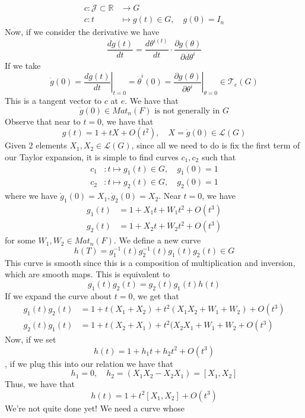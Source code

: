 \documentclass[11pt, oneside]{article}   	%
\theoremstyle{slanted}
\begin{document}
\begin{align*}
	c : \mathcal{ J } \subset \mathbb{ R}  & \to G \\
	c : t  & \mapsto g ( t) \in G , \quad g ( 0 )  = I_n 
\end{align*} Now, if we consider 
the derivative we have 
\[
	\frac{ d g ( t) }{ dt } = \frac{ d \theta ^{ i ( t ) }}{d t } \cdot \frac{\partial  g ( \theta ) }{\partial d \theta^{ i }} 
\] If we take 
\[
\dot{ g } ( 0 )  = \left. \frac{ d g( t) }{ dt } \right \vert_{ t =0 } = \dot{ \theta}^{ i }( 0 )  = \left. \frac{\partial g ( \theta ) }{\partial \theta^{i }} \right \vert_{ \theta  =0 } \in \mathcal{ T }_e ( G )
\] This is a tangent vector to $c $ at $ e $. 
We have that 
\[
\dot{ g} ( 0 ) \in Mat_n ( F) \text{ is not generally in } G 
\] Observe that near to $ t  = 0 $, we have that 
\[	 g( t)  = 1 + tX + O ( t^2 ), \quad X = \dot{ g} ( 0 ) \in \mathcal{ L }( G )  
\] Given 2 elements $ X_1, X_2 \in \mathcal{ L } ( G ) $, since all 
we need to do is fix the first term of our Taylor expansion, 
it is simple to find curves $ c_1, c_2 $ such that 
\begin{align*}
c_1 &: t \mapsto g_1 ( t) \in G, \quad g_1 ( 0 )  = 1 \\
c_2 &: t \mapsto g_2( t) \in G, \quad g_2 ( 0 )  = 1
\end{align*} where we have $ \dot{ g}_1( 0 )  = X_1, \dot{ g}_2 ( 0 )  = X_2$. 
Near  $ t = 0 $, we have 
\begin{align*}
g_1 ( t ) & = 1 + X_1 t + W_1 t^2 + O ( t^3 ) \\
g_2 ( t) &= 1 + X_2 t + W_2 t^2 + O ( t^ 3 ) 
\end{align*}for some $ W_1, W_2 \in Mat_n ( F) $. 
We define a new curve 
\[
h ( T)  = g^{ - 1}_1( t)  g^{ -1 }_2 ( t ) g_1 ( t) g_2( t) \in G 
\] This curve is smooth since this is a composition of multiplication 
and inversion, which are smooth maps. This is equivalent to 
\[
g_1( t) g_2( t) = g_2 ( t ) g_1 ( t) h ( t) 
\] If we expand the curve about $ t = 0 $, we get 
that 
\begin{align*}
g_1( t)g_2 ( t) &=  1 + t ( X_1 + X_2 ) +t^2 ( X_1 X_2 + W_1 + W_2 ) + O ( t^3)  \\
g_2( t) g_1( t) &=  1 + t ( X_2 + X_1 ) + t^2 ( X_2 X_1 + W_1 + W_2 + O ( t^3 ) 
\end{align*}
Now, if we set 
\[
h ( t) = 1 + h_1 t + h_2 t^2 + O ( t^3 ) 
\], if we plug this into our relation we have that 
\[
h_1 = 0, \quad h_2  = ( X_1 X_2 - X_2 X_1 ) =  [ X_1 , X_2 ] 
\] Thus, we have that 
\[
h ( t)  = 1 + t^2 [ X_1 , X_2 ] + O ( t^3) 
\] We're not quite done yet! We need a curve whose 
\end{document}
